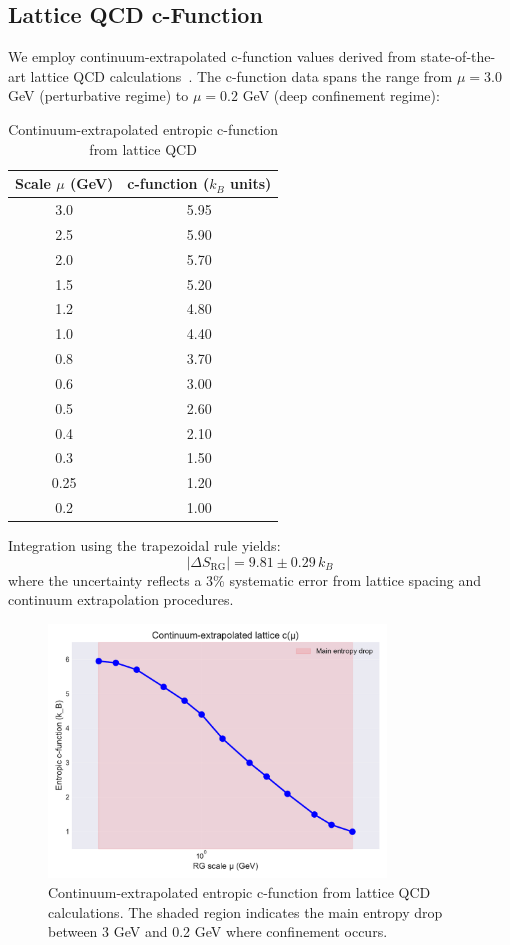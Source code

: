 \documentclass[12pt,a4paper]{article}
\begin{document}
\subsection{Lattice QCD c-Function}

We employ continuum-extrapolated c-function values derived from state-of-the-art lattice QCD calculations~\cite{HotQCD2021,Borsanyi2010,Caselle1997}. The c-function data spans the range from $\mu = 3.0$ GeV (perturbative regime) to $\mu = 0.2$ GeV (deep confinement regime):

\begin{table}[H]
\centering
\caption{Continuum-extrapolated entropic c-function from lattice QCD}
\label{tab:cfunction}
\begin{tabular}{cc}
\toprule
Scale $\mu$ (GeV) & c-function ($k_B$ units) \\
\midrule
3.0 & 5.95 \\
2.5 & 5.90 \\
2.0 & 5.70 \\
1.5 & 5.20 \\
1.2 & 4.80 \\
1.0 & 4.40 \\
0.8 & 3.70 \\
0.6 & 3.00 \\
0.5 & 2.60 \\
0.4 & 2.10 \\
0.3 & 1.50 \\
0.25 & 1.20 \\
0.2 & 1.00 \\
\bottomrule
\end{tabular}
\end{table}

Integration using the trapezoidal rule yields:
\begin{equation}
|\Delta S_{\text{RG}}| = 9.81 \pm 0.29 \, k_B
\end{equation}
where the uncertainty reflects a 3\% systematic error from lattice spacing and continuum extrapolation procedures.

\begin{figure}[H]
\centering
\includegraphics[width=0.8\textwidth]{c_function.pdf}
\caption{Continuum-extrapolated entropic c-function from lattice QCD calculations. The shaded region indicates the main entropy drop between 3 GeV and 0.2 GeV where confinement occurs.}
\label{fig:cfunction}
\end{figure}
\end{document}
